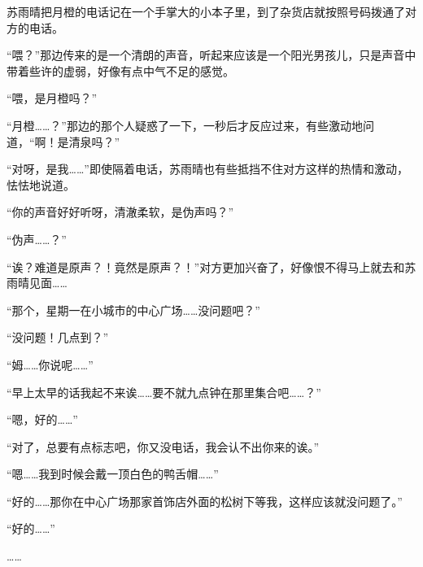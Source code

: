 苏雨晴把月橙的电话记在一个手掌大的小本子里，到了杂货店就按照号码拨通了对方的电话。

“喂？”那边传来的是一个清朗的声音，听起来应该是一个阳光男孩儿，只是声音中带着些许的虚弱，好像有点中气不足的感觉。

“喂，是月橙吗？”

“月橙……？”那边的那个人疑惑了一下，一秒后才反应过来，有些激动地问道，“啊！是清泉吗？”

“对呀，是我……”即使隔着电话，苏雨晴也有些抵挡不住对方这样的热情和激动，怯怯地说道。

“你的声音好好听呀，清澈柔软，是伪声吗？”

“伪声……？”

“诶？难道是原声？！竟然是原声？！”对方更加兴奋了，好像恨不得马上就去和苏雨晴见面……

“那个，星期一在小城市的中心广场……没问题吧？”

“没问题！几点到？”

“姆……你说呢……”

“早上太早的话我起不来诶……要不就九点钟在那里集合吧……？”

“嗯，好的……”

“对了，总要有点标志吧，你又没电话，我会认不出你来的诶。”

“嗯……我到时候会戴一顶白色的鸭舌帽……”

“好的……那你在中心广场那家首饰店外面的松树下等我，这样应该就没问题了。”

“好的……”

……
